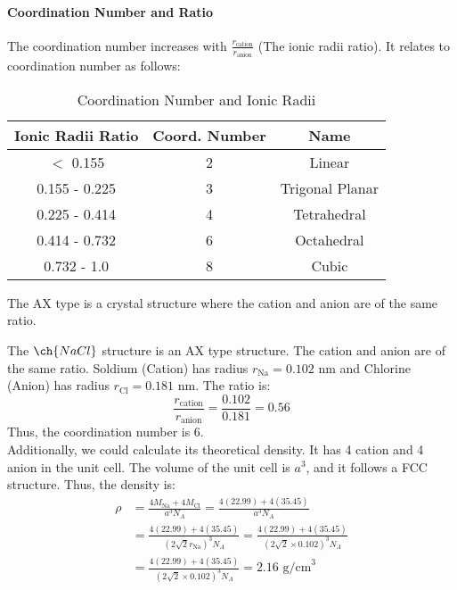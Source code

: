 \documentclass[11pt]{article}
\begin{document}
\paragraph{Coordination Number and Ratio} The coordination number increases with $\frac{r_{\text{cation}}}{r_{\text{anion}}}$ (The ionic radii ratio).  It relates to coordination number as follows:
\begin{table}[h]
    \centering
    \begin{tabular}{|c|c|c|}
        \hline
        \textbf{Ionic Radii Ratio} & \textbf{Coord. Number} & \textbf{Name} \\
        \hline
        $<$ 0.155 & 2 & Linear \\
        0.155 - 0.225 & 3 & Trigonal Planar \\
        0.225 - 0.414 & 4 & Tetrahedral \\
        0.414 - 0.732 & 6 & Octahedral \\
        0.732 - 1.0 & 8 & Cubic \\
        \hline
    \end{tabular}
    \caption{Coordination Number and Ionic Radii}
    \label{tab:coordination-number}
\end{table} 
\begin{definition}[AX Type]
    The AX type is a crystal structure where the cation and anion are of the same ratio. 
\end{definition}
\begin{example}
    The $\ch{NaCl}$ structure is an AX type structure. The cation and anion are of the same ratio. Soldium (Cation) has radius $r_{\text{Na}} = 0.102$ nm and Chlorine (Anion) has radius $r_{\text{Cl}} = 0.181$ nm. The ratio is:
    $$ \frac{r_{\text{cation}}}{r_{\text{anion}}} = \frac{0.102}{0.181} = 0.56 $$
    Thus, the coordination number is 6.\\
    Additionally, we could calculate its theoretical density. It has 4 cation and 4 anion in the unit cell. The volume of the unit cell is $a^3$, and it follows a FCC structure. Thus, the density is: 
    \begin{align*}
        \rho &= \frac{4M_{\text{Na}} + 4M_{\text{Cl}}}{a^3 N_A} = \frac{4(22.99) + 4(35.45)}{a^3 N_A} \\
        &= \frac{4(22.99) + 4(35.45)}{(2\sqrt{2}r_{\text{Na}})^3 N_A} = \frac{4(22.99) + 4(35.45)}{(2\sqrt{2} \times 0.102)^3 N_A} \\
        &= \frac{4(22.99) + 4(35.45)}{(2\sqrt{2} \times 0.102)^3 N_A} = 2.16 \text{ g/cm}^3
    \end{align*}
\end{example}
\end{document}
